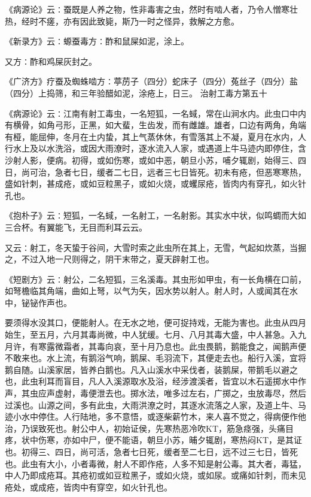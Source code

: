 \documentclass[a4paper,12pt,UTF8,twoside]{ctexbook}
\begin{document}
《病源论》云∶蚕既是人养之物，性非毒害之虫，然时有啮人者，乃令人憎寒壮热，经时不瘥，亦有因此致毙，斯乃一时之怪异，救解之方愈。

《新录方》云∶螈蚕毒方∶酢和鼠屎如泥，涂上。

又方∶酢和鸡屎灰封之。

《广济方》疗蚕及蜘蛛啮方∶葶苈子（四分）蛇床子（四分）菟丝子（四分）盐（四分）上捣筛，和三年验醋如泥，涂疮上，日三。
治射工毒方第五十

《病源论》云∶江南有射工毒虫，一名短狐，一名蜮，常在山涧水内。此虫口中内有横骨，如角弓形，正黑，如大蜚，生齿发，而有雌雄。雄者，口边有两角，角端有桠，能屈伸，冬月在土内蛰，其上气蒸休休，有雪落其上不凝，夏月在水内，人行水上及以水洗浴，或因大雨潦时，逐水流入人家，或遇道上牛马迹内即停住，含沙射人影，便病。初得，或如伤寒，或如中恶，朝旦小苏，哺夕辄剧，始得三、四日，尚可治，急者七日，缓者二七日，远者三七日皆死。初未有疮，但恶寒寒热，盛如针刺，甚成疮，或如豆粒黑子，或如火烧，或蠼尿疮，皆肉内有穿孔，如火针孔也。

《抱朴子》云∶短狐，一名蜮，一名射工，一名射影。其实水中状，似鸣蜩而大如三合杯。有翼能飞，无目而利耳云云。

又云∶射工，冬天蛰于谷间，大雪时索之此虫所在其上，无雪，气起如炊蒸，当掘之，不过入地一尺则得之，阴干末带之，夏天辟射工也。

《短剧方》云∶射公，二名短狐，三名溪毒。其虫形如甲虫，有一长角横在口前，如弩檐临其角端，曲如上弩，以气为矢，因水势以射人。射人时，人或闻其在水中，铋铋作声也。

要须得水没其口，便能射人。在无水之地，便可捉持戏，无能为害也。此虫从四月始生，至五月，六月其毒尚微，中人犹缓。七月、八月其毒大盛，中人甚急。入九月许，有寒露微霜者，其毒向哀，至十月乃息也。此虫畏鹅，鹅能食之，闻鹅声便不敢来也。水上流，有鹅浴气响，鹅屎、毛羽流下，其便走去也。船行入溪，宜将鹅自随。山溪家居，皆养白鹅也。凡入山溪水中采伐者，装鹅屎，带鹅毛以避之也，此虫利耳而盲目，凡人入溪源取水及浴，经涉渡溪者，皆宜以木石遥掷水中作声，其虫应声虚射，毒便泄去也。掷水法，唯多过左右，广掷之，虫放毒尽，然后过溪也。山源之间，多有此虫，大雨洪潦之时，其逐水流落之人家，及道上牛、马迹小水中停住。人行陆地，多不意悟，或逐柴薪竹木，来人喜不觉之，得病便作他治，乃误致死也。射公中人，初始证侯，先寒热恶冷吹KT，筋急痉强，头痛目疼，状中伤寒，亦如中尸，便不能语，朝旦小苏，晡夕辄剧，寒热闷KT，是其证也。初得三、四日，尚可活，急者七日死，缓者至二七日，远不过三七日，皆死也。此虫有大小，小者毒微，射人不即作疮，人多不知是射公毒。其大者，毒猛，中人乃即成疮耳。其疮初或如豆粒黑子，或如火烧，或如尿。或痛如针刺，而未见疮处，或成疮，皆肉中有穿空，如火针孔也。
\end{document}
